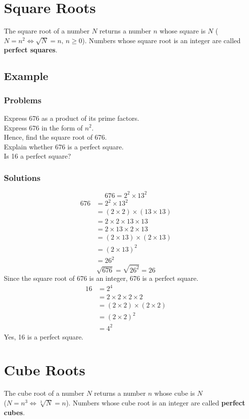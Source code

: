 \documentclass[a4paper,12pt]{article}
\begin{document}
\section{Square Roots}
The square root of a number \(N\) returns a number \(n\) whose square is \(N\) (\(N=n^2\iff\sqrt N=n,\,n\geqslant0\)). Numbers whose square root is an integer are called {\bf perfect squares}.
\subsection{Example}
\subsubsection{Problems}
Express 676 as a product of its prime factors.\\
Express 676 in the form of \(n^2\).\\
Hence, find the square root of 676.\\
Explain whether 676 is a perfect square.\\
Is 16 a perfect square?
\subsubsection{Solutions}
\[676=\boxed{2^2\times13^2}\]
\[\begin{aligned}
    676&=2^2\times13^2\\
    &=(2\times2)\times(13\times13)\\
    &=2\times2\times13\times13\\
    &=2\times13\times2\times13\\
    &=(2\times13)\times(2\times13)\\
    &=(2\times13)^2\\
    &=\boxed{26^2}
\end{aligned}\]
\[\sqrt{676}=\sqrt{26^2}=\boxed{26}\]	
Since the square root of 676 is an integer, 676 is a perfect square.
\[\begin{aligned}
    16&=2^4\\
    &=2\times2\times2\times2\\
    &=(2\times2)\times(2\times2)\\
    &=(2\times2)^2\\
    &=4^2
\end{aligned}\]
Yes, 16 is a perfect square.

\section{Cube Roots}
The cube root of a number \(N\) returns a number \(n\) whose cube is \(N\)\\(\(N=n^3\iff\sqrt[3]N=n\)). Numbers whose cube root is an integer are called {\bf perfect cubes}. 
\end{document}
